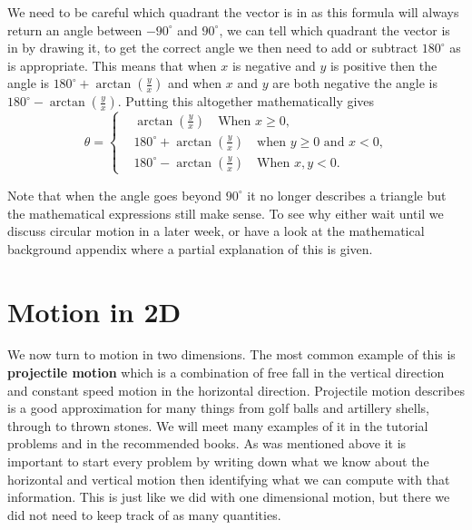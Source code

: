 \documentclass[a4paper,12pt]{book}
\begin{document}
We need to be careful which quadrant the vector is in as this formula will always return an angle between $-90^{\circ}$ and $90^{\circ}$, we can tell which quadrant the vector is in by drawing it, to get the correct angle we then need to add or subtract $180^{\circ}$ as is appropriate. This means that when $x$ is negative and $y$ is positive then the angle is $180^{\circ}+\arctan\left(\frac{y}{x}\right)$ and when $x$ and $y$ are both negative the angle is $180^{\circ}-\arctan\left(\frac{y}{x}\right)$. Putting this altogether mathematically gives
\begin{equation*}
    \theta =\begin{cases}
        &\arctan\left(\frac{y}{x}\right) \quad \text{When $x\geq 0$,}\\
        &180^{\circ}+\arctan\left(\frac{y}{x}\right)\quad \text{when $y\geq 0$ and $x<0$,}\\
        &180^{\circ}-\arctan\left(\frac{y}{x}\right) \quad \text{When $x,y <0$.}
    \end{cases}
\end{equation*}

Note that when the angle goes beyond $90^{\circ}$ it no longer describes a triangle but the mathematical expressions still make sense. To see why either wait until we discuss circular motion in a later week, or have a look at the mathematical background appendix where a partial explanation of this is given.


\section{Motion in 2D}
We now turn to motion in two dimensions. The most common example of this is \textbf{projectile motion} which is a combination of free fall in the vertical direction and constant speed motion in the horizontal direction.  Projectile motion describes is a good approximation for many things from golf balls and artillery shells, through to thrown stones. We will meet many examples of it in the tutorial problems and in the recommended books. As was mentioned above it is important to start every problem by writing down what we know about the horizontal and vertical motion then identifying what we can compute with that information. This is just like we did with one dimensional motion, but there we did not need to keep track of as many quantities.
\end{document}
